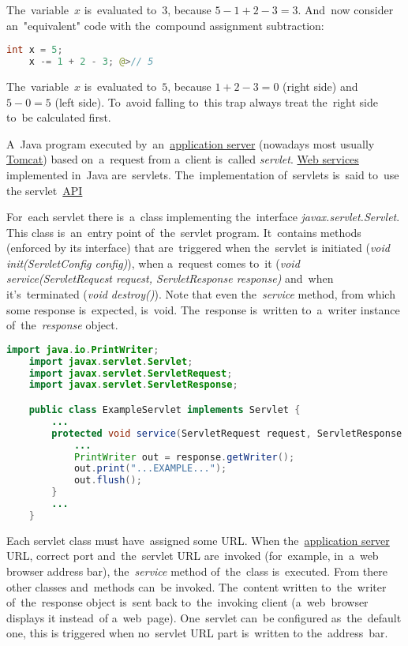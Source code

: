 \noindent The~variable~$x$ is~evaluated to~$3$, because $5-1+2-3=3$. And~now consider an~"equivalent" code with the~compound assignment subtraction:
\begin{lstlisting}[language=Java, frame=no]
    int x = 5;
    x -= 1 + 2 - 3; @>// 5
\end{lstlisting}

\noindent The~variable~$x$ is~evaluated to~$5$, because $1+2-3=0$ (right side) and~$5-0=5$ (left side). To~avoid falling to~this trap always treat the~right side to~be calculated first.

\label{serialization}

\label{servlet}
A~Java program executed by~an~\hyperref[applicationserver]{application server} (nowadays most usually \hyperref[tomcat]{Tomcat}) based on~a~request from a~client is~called \textit{servlet}. \hyperref[webserviceapplication]{Web services} implemented in~Java are~servlets. The~implementation of~servlets is~said to~use the servlet~\hyperref[api]{API}

For~each servlet there is~a~class implementing the~interface \textit{javax.servlet.Servlet}. This class is~an~entry point of~the~servlet program. It~contains methods (enforced by its interface) that are~triggered when the~servlet is initiated (\textit{void init(ServletConfig config)}), when a~request comes to~it (\textit{void service(ServletRequest request, ServletResponse response)} and~when it's~terminated (\textit{void destroy()}). Note that even the~\textit{service} method, from which some response is~expected, is~void. The~response is~written to~a~writer instance of~the~\textit{response} object.

\enlargethispage{10mm}
\example
\begin{lstlisting}[language=Java]
    import java.io.PrintWriter;
    import javax.servlet.Servlet;
    import javax.servlet.ServletRequest;
    import javax.servlet.ServletResponse;

    public class ExampleServlet implements Servlet {
        ...
        protected void service(ServletRequest request, ServletResponse response) {
            ...
            PrintWriter out = response.getWriter();
            out.print("...EXAMPLE...");
            out.flush();
        }
        ...
    }
\end{lstlisting}

\noindent Each servlet class must have~assigned some URL. When the~\hyperref[applicationserver]{application server} URL, correct port and~the~servlet URL are~invoked (for~example, in~a~web browser address bar), the~\textit{service} method of~the~class is~executed. From there other classes and~methods can~be invoked. The~content written to~the~writer of~the~response object is~sent back to~the~invoking client (a~web~browser displays it instead~of a~web~page). One~servlet can~be configured as~the~default one, this is triggered when no~servlet URL part is~written to the~address~bar.

